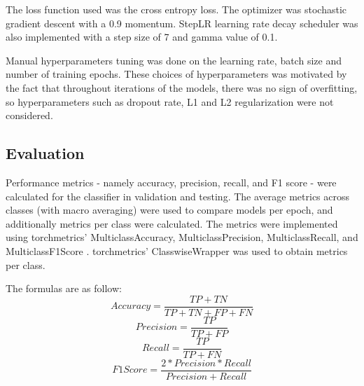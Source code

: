 The loss function used was the cross entropy loss. The optimizer was stochastic gradient descent with a 0.9 momentum. StepLR learning rate decay scheduler was also implemented with a step size of 7 and gamma value of 0.1.

Manual hyperparameters tuning was done on the learning rate, batch size and number of training epochs. These choices of hyperparameters was motivated by the fact that throughout iterations of the models, there was no sign of overfitting, so hyperparameters such as dropout rate, L1 and L2 regularization were not considered.

\subsection{Evaluation}
Performance metrics - namely accuracy, precision, recall, and F1 score - were calculated for the classifier in validation and testing. The average metrics across classes (with macro averaging) were used to compare models per epoch, and additionally metrics per class were calculated. The metrics were implemented using torchmetrics' MulticlassAccuracy, MulticlassPrecision, MulticlassRecall, and MulticlassF1Score \cite{torchmetrics}. torchmetrics' ClasswiseWrapper was used to obtain metrics per class.

The formulas are as follow:
\[Accuracy = \frac{TP+TN}{TP+TN+FP+FN}\]
\[Precision = \frac{TP}{TP+FP}\]
\[Recall = \frac{TP}{TP+FN}\]
\[F1 Score = \frac{2 * Precision * Recall}{Precision + Recall}\]

